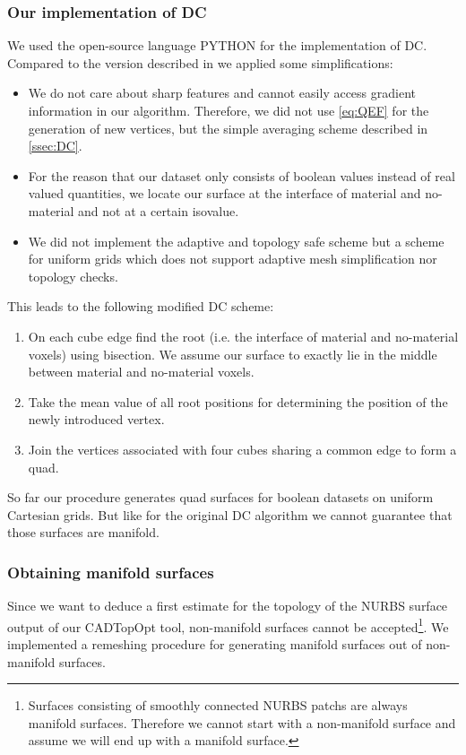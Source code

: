\subsubsection{Our implementation of \ac{DC}}
We used the open-source language PYTHON \cite{Python} for the implementation of \ac{DC}. Compared to the version described in \cite{Hermite2002} we applied some simplifications:
\begin{itemize}
\item We do not care about sharp features and cannot easily access gradient information in our algorithm. Therefore, we did not use \autoref{eq:QEF} for the generation of new vertices, but the simple averaging scheme described in \autoref{ssec:DC}.
\item For the reason that our dataset only consists of boolean values instead of real valued quantities, we locate our surface at the interface of material and no-material and not at a certain isovalue.
\item We did not implement the adaptive and topology safe scheme but a scheme for uniform grids which does not support adaptive mesh simplification nor topology checks.
\end{itemize}
This leads to the following modified \ac{DC} scheme:
\begin{enumerate}
\item On each cube edge find the root (i.e. the interface of material and no-material voxels) using bisection. We assume our surface to exactly lie in the middle between material and no-material voxels.
\item Take the mean value of all root positions for determining the position of the newly introduced vertex.
\item Join the vertices associated with four cubes sharing a common edge to form a \ac{quad}.
\end{enumerate}
So far our procedure generates \ac{quad} surfaces for boolean datasets on uniform Cartesian grids. But like for the original \ac{DC} algorithm we cannot guarantee that those surfaces are manifold.

\subsubsection{Obtaining manifold surfaces}
Since we want to deduce a first estimate for the topology of the \ac{NURBS} surface output of our \ac{CADTopOpt} tool, non-manifold surfaces cannot be accepted\footnote{Surfaces consisting of smoothly connected \ac{NURBS} \acp{patch} are always manifold surfaces. Therefore we cannot start with a non-manifold surface and assume we will end up with a manifold surface.}. We implemented a remeshing procedure for generating manifold surfaces out of non-manifold surfaces.

